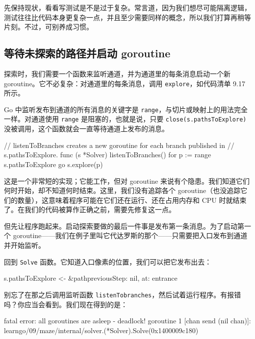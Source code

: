 先保持现状，看看写测试是不是过于复杂。常言道，因为我们想尽可能隔离逻辑，测试往往比代码本身更复杂一点，并且至少需要同样的概念，所以我们打算再稍等片刻。不过，可别养成习惯。

\subsection{等待未探索的路径并启动 goroutine}

探索时，我们需要一个函数来监听通道，并为通道里的每条消息启动一个新 goroutine。它不必复杂：对通道里的每条消息，调用 \texttt{explore}，如代码清单 9.17 所示。

Go 中监听发布到通道的所有消息的关键字是 \texttt{range}，与切片或映射上的用法完全一样。对通道使用 \texttt{range} 是阻塞的，也就是说，只要 \texttt{close(s.pathsToExplore)} 没被调用，这个函数就会一直等待通道上发布的消息。

\begin{gocode}[title={代码清单 9.17 \texttt{explore.go}：监听通道}]
// listenToBranches creates a new goroutine for each branch published in
// s.pathsToExplore.
func (s *Solver) listenToBranches() {
    for p := range s.pathsToExplore {
        go s.explore(p)
    }
}
\end{gocode}

这是一个非常短的实现；它能工作，但对 goroutine 来说有个隐患。我们知道它们何时开始，却不知道何时结束。这里，我们没有追踪各个 goroutine（也没追踪它们的数量），这意味着程序可能在它们还在运行、还在占用内存和 CPU 时就结束了。在我们的代码被算作正确之前，需要先修复这一点。

但先让程序跑起来。启动探索要做的最后一件事是发布第一条消息。为了启动第一个 goroutine——我们在例子里叫它代达罗斯的那个——只需要把入口发布到通道并开始监听。

回到 \texttt{Solve} 函数。它知道入口像素的位置，我们可以把它发布出去：

\begin{gocode}[]
s.pathsToExplore <- &path{previousStep: nil, at: entrance}
\end{gocode}

别忘了在那之后调用监听函数 \texttt{listenTobranches}，然后试着运行程序。有报错吗？你应当会看到。我们现在得到的是：

\begin{shellcode}[]
fatal error: all goroutines are asleep - deadlock!
goroutine 1 [chan send (nil chan)]:
learngo/09/maze/internal/solver.(*Solver).Solve(0x1400009c180)
\end{shellcode}

